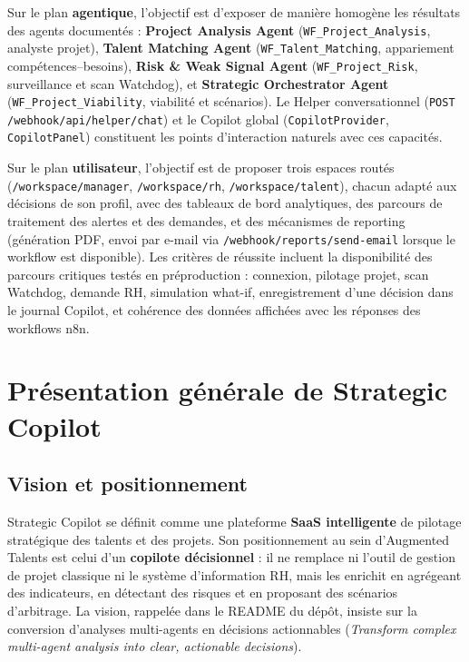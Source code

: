 Sur le plan \textbf{agentique}, l'objectif est d'exposer de manière homogène les résultats des agents documentés : \textbf{Project Analysis Agent} (\texttt{WF\_Project\_Analysis}, analyste projet), \textbf{Talent Matching Agent} (\texttt{WF\_Talent\_Matching}, appariement compétences--besoins), \textbf{Risk \& Weak Signal Agent} (\texttt{WF\_Project\_Risk}, surveillance et scan Watchdog), et \textbf{Strategic Orchestrator Agent} (\texttt{WF\_Project\_Viability}, viabilité et scénarios). Le Helper conversationnel (\texttt{POST /webhook/api/helper/chat}) et le Copilot global (\texttt{CopilotProvider}, \texttt{CopilotPanel}) constituent les points d'interaction naturels avec ces capacités.

Sur le plan \textbf{utilisateur}, l'objectif est de proposer trois espaces routés (\texttt{/workspace/manager}, \texttt{/workspace/rh}, \texttt{/workspace/talent}), chacun adapté aux décisions de son profil, avec des tableaux de bord analytiques, des parcours de traitement des alertes et des demandes, et des mécanismes de reporting (génération PDF, envoi par e-mail via \texttt{/webhook/reports/send-email} lorsque le workflow est disponible). Les critères de réussite incluent la disponibilité des parcours critiques testés en préproduction : connexion, pilotage projet, scan Watchdog, demande RH, simulation what-if, enregistrement d'une décision dans le journal Copilot, et cohérence des données affichées avec les réponses des workflows n8n.

\section{Présentation générale de Strategic Copilot}

\subsection{Vision et positionnement}

Strategic Copilot se définit comme une plateforme \textbf{SaaS intelligente} de pilotage stratégique des talents et des projets. Son positionnement au sein d'Augmented Talents est celui d'un \textbf{copilote décisionnel} : il ne remplace ni l'outil de gestion de projet classique ni le système d'information RH, mais les enrichit en agrégeant des indicateurs, en détectant des risques et en proposant des scénarios d'arbitrage. La vision, rappelée dans le README du dépôt, insiste sur la conversion d'analyses multi-agents en décisions actionnables (\emph{Transform complex multi-agent analysis into clear, actionable decisions}).

